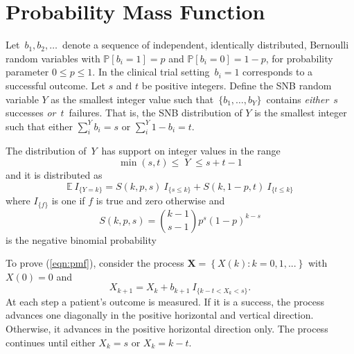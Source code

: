 \documentclass[review]{elsarticle}
\begin{document}
\section{Probability Mass Function}
\label{notation.section}

Let $\,b_1, b_2, \ldots \,$ denote a sequence of independent, identically
distributed, Bernoulli random variables with $\mathbb{P}[b_i=1]=p$ and
$\mathbb{P}[b_i = 0] = 1-p$, for
probability parameter $0\leq p \leq 1$. In the clinical trial setting
$\,b_i = 1$ corresponds to a successful outcome.  Let $s$ and $t$ be
positive integers.  Define the SNB random
variable $Y$ as the smallest
integer value such that $\,\{b_1, \ldots , b_Y\}\,$ contains {\em either}
$\,s\,$ successes {\em or} $\,t\,$ failures. That is, the SNB distribution
of $Y$ is the smallest integer such that either
$\sum_i^Y b_i = s$ or $\sum_i^Y 1-b_i = t$.

The distribution of $\,Y\,$ has support on integer values in the range
\begin{equation*}               
     \min(s,t) \leq \; Y \;\leq s+t-1  \label{range.y.eq}
\end{equation*}
and it is distributed as
\begin{equation} \label{eqn:pmf}
\mathbb{E}\  I_{\{Y=k\}} = S(k, p, s) \ I_{\{s \leq k\}} + 
  S(k, 1-p, t) \ I_{\{ t \leq k \}}
\end{equation}
where $I_{\{f\}}$ is one if $f$ is true and zero otherwise and
\begin{equation} \label{eqn:N}
S(k, p, s) = {k-1 \choose s-1} p^s (1-p)^{k-s} 
\end{equation}
is the negative binomial probability

To prove (\ref{eqn:pmf}), consider the
process $\mathbf{X} = \left\{X(k) : k = 0,1,... \right\}$
with $X(0)=0$ and
\begin{equation*} \label{eqn:proc}
X_{k+1} = X_k + b_{k+1} \ I_{\{ k-t < X_k < s\}}.
\end{equation*}
At each step a patient's outcome is measured. If it is a success, the process 
advances one diagonally in the
positive horizontal and vertical direction.
Otherwise, it advances in the positive horizontal direction only. The
process continues until either $X_k = s$ or $X_k = k-t$.
\end{document}
